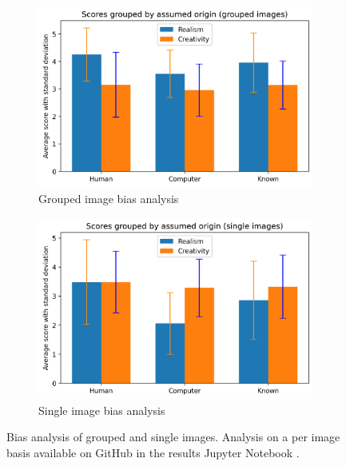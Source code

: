\begin{figure}
\centering
\begin{subfigure}{.45\textwidth}
  \centering
  \includegraphics[width=\textwidth]{images/grouped_images_score_bias.png}
  \caption{Grouped image bias analysis}
  \label{fig:grouped_bias}
\end{subfigure}%
\hspace{.02\textwidth}
\begin{subfigure}{.45\textwidth}
  \centering
  \includegraphics[width=\textwidth]{images/single_images_score_bias.png}
  \caption{Single image bias analysis}
  \label{fig:single_bias}
\end{subfigure}
\captionsetup{width=.85\linewidth}
\captionsetup{justification=centering}
\caption{ Bias analysis of grouped and single images. Analysis on a per image basis available on GitHub in the results Jupyter Notebook \citep{github_project}. }
\label{fig:bias}
\end{figure}

